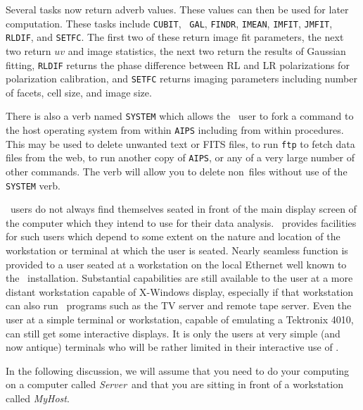 Several tasks now return adverb values.  These values can then be
used for later computation.  These tasks include {\tt CUBIT}, {\tt
GAL}, {\tt FINDR}, {\tt IMEAN}, {\tt IMFIT}, {\tt JMFIT}, {\tt RLDIF},
and {\tt SETFC}.  The first two of these return image fit
parameters, the next two return $uv$ and image statistics, the next
two return the results of Gaussian fitting, {\tt RLDIF} returns the
phase difference between RL and LR polarizations for polarization
calibration, and {\tt SETFC} returns imaging parameters including
number of facets, cell size, and image size.

There is also a verb named {\tt SYSTEM} which allows the \AIPS\ user
to fork a command to the host operating system from within {\tt AIPS}
including from within procedures.  This may be used to delete unwanted
text or FITS files, to run {\tt ftp} to fetch data files from the web,
to run another copy of {\tt AIPS}, or any of a very large number of
other commands.  The verb {\tt {}} will allow you to
delete non\AIPS\ files without use of the {\tt SYSTEM} verb.

\def\MyH{{\it MyHost\/}}
\def\Ser{{\it Server\/}}

     \AIPS\ users do not always find themselves seated in front of the
main display screen of the computer which they intend to use for their
data analysis.  \AIPS\ provides facilities for such users which depend
to some extent on the nature and location of the workstation or
terminal at which the user is seated.  Nearly seamless function is
provided to a user seated at a workstation on the local Ethernet well
known to the \AIPS\ installation.  Substantial capabilities are still
available to the user at a more distant workstation capable of
X-Windows display, especially if that workstation can also run \AIPS\
programs such as the TV server and remote tape server.  Even the user
at a simple terminal or workstation, capable of emulating a Tektronix
4010, can still get some interactive displays.  It is only the users
at very simple (and now antique) terminals who will be rather limited
in their interactive use of \AIPS\@.\Iodx{remote user}


     In the following discussion, we will assume that you need to do
your computing on a computer called \Ser\ and that you are
sitting in front of a workstation called \MyH.

